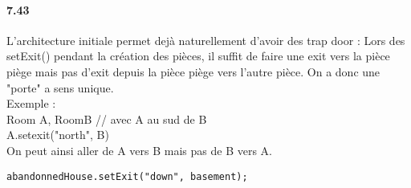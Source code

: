 \documentclass[11pt,a4paper]{report}
\begin{document}
\paragraph{7.43}
L'architecture initiale permet dejà naturellement d'avoir des trap door : Lors des setExit() pendant la création des pièces, il suffit de faire une exit vers la pièce piège mais pas d'exit depuis la pièce piège vers l'autre pièce. On a donc une "porte" a sens unique. \\
Exemple :\\
Room A, RoomB // avec A au sud de B\\
A.setexit("north", B)\\
On peut ainsi aller de A vers B mais pas de B vers A.
\begin{lstlisting}
abandonnedHouse.setExit("down", basement);
\end{lstlisting}
\end{document}
